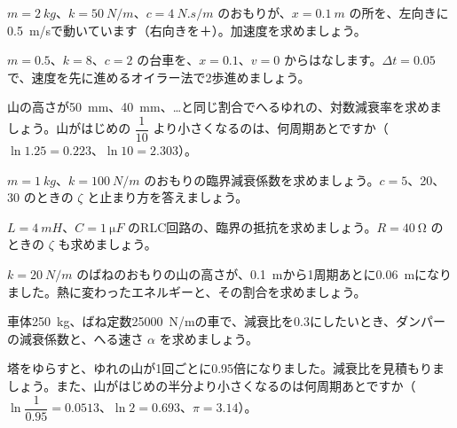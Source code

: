 \bkendproblems
{}

\bkproblem $m=\qty{2}{kg}$、$k=\qty{50}{N/m}$、$c=\qty{4}{N.s/m}$ のおもりが、$x=\qty{0.1}{m}$ の所を、左向きに\qty{0.5}{m/s}で動いています（右向きを＋）。加速度を求めましょう。

\bkproblem $m=0.5$、$k=8$、$c=2$ の台車を、$x=0.1$、$v=0$ からはなします。$\Delta t=0.05$ で、速度を先に進めるオイラー法で2歩進めましょう。

\bkproblem 山の高さが\qty{50}{mm}、\qty{40}{mm}、…と同じ割合でへるゆれの、対数減衰率を求めましょう。山がはじめの $\dfrac{1}{10}$ より小さくなるのは、何周期あとですか（$\ln1.25=0.223$、$\ln10=2.303$）。

\bkproblem $m=\qty{1}{kg}$、$k=\qty{100}{N/m}$ のおもりの臨界減衰係数を求めましょう。$c=5$、20、30 のときの $\zeta$ と止まり方を答えましょう。

\bkproblem $L=\qty{4}{mH}$、$C=\qty{1}{\micro F}$ のRLC回路の、臨界の抵抗を求めましょう。$R=\qty{40}{\ohm}$ のときの $\zeta$ も求めましょう。

\bkproblem $k=\qty{20}{N/m}$ のばねのおもりの山の高さが、\qty{0.1}{m}から1周期あとに\qty{0.06}{m}になりました。熱に変わったエネルギーと、その割合を求めましょう。




\bkproblem 車体\qty{250}{kg}、ばね定数\qty{25000}{N/m}の車で、減衰比を0.3にしたいとき、ダンパーの減衰係数と、へる速さ $\alpha$ を求めましょう。

\bkproblem 塔をゆらすと、ゆれの山が1回ごとに0.95倍になりました。減衰比を見積もりましょう。また、山がはじめの半分より小さくなるのは何周期あとですか（$\ln\dfrac{1}{0.95}=0.0513$、$\ln2=0.693$、$\pi=3.14$）。

